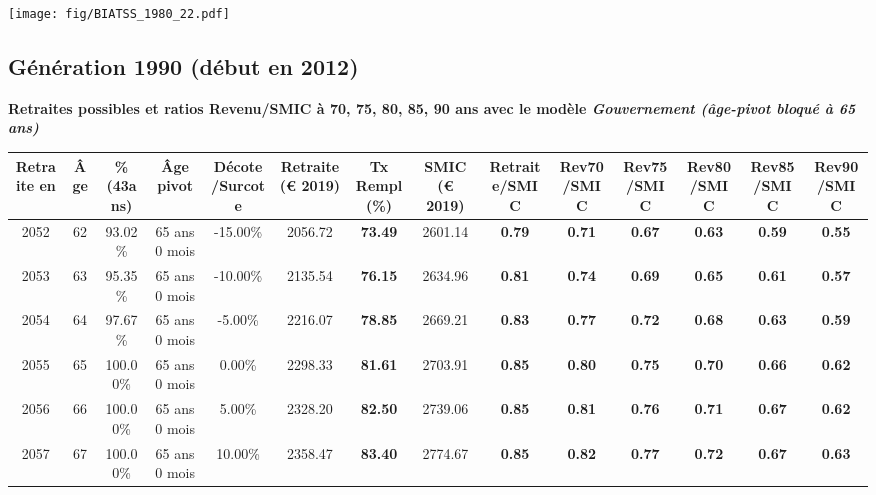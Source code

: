  \vspace{0.1cm} 

 \begin{center}\texttt{[image: fig/BIATSS\_1980\_22.pdf]}\end{center} \label{fig/BIATSS_1980_22.pdf} 

\newpage 
 
\subsection{Génération 1990 (début en 2012)} 

{\bf \noindent Retraites possibles et ratios Revenu/SMIC à 70, 75, 80, 85, 90 ans avec le modèle \emph{Gouvernement (âge-pivot bloqué à 65 ans)}}  
 
\begin{adjustbox}{max width=\textwidth} 
\begin{tabular}[htb]{|c|c||c|c|c||c|c||c||c|c|c|c|c|c|} 
\hline 
 Retraite en &  Âge &  \%(43ans) &  Âge pivot &  Décote/Surcote &  Retraite (\euro{} 2019) &  Tx Rempl(\%) &  SMIC (\euro{} 2019) &  Retraite/SMIC &  Rev70/SMIC &  Rev75/SMIC &  Rev80/SMIC &  Rev85/SMIC &  Rev90/SMIC \\ 
\hline \hline 
 2052 &  62 &  93.02\% &  65 ans 0 mois &  -15.00\% &  2056.72 &  {\bf 73.49} &  2601.14 &  {\bf {\color{red} 0.79}} &  {\bf {\color{red} 0.71}} &  {\bf {\color{red} 0.67}} &  {\bf {\color{red} 0.63}} &  {\bf {\color{red} 0.59}} &  {\bf {\color{red} 0.55}} \\ 
\hline 
 2053 &  63 &  95.35\% &  65 ans 0 mois &  -10.00\% &  2135.54 &  {\bf 76.15} &  2634.96 &  {\bf {\color{red} 0.81}} &  {\bf {\color{red} 0.74}} &  {\bf {\color{red} 0.69}} &  {\bf {\color{red} 0.65}} &  {\bf {\color{red} 0.61}} &  {\bf {\color{red} 0.57}} \\ 
\hline 
 2054 &  64 &  97.67\% &  65 ans 0 mois &  -5.00\% &  2216.07 &  {\bf 78.85} &  2669.21 &  {\bf {\color{red} 0.83}} &  {\bf {\color{red} 0.77}} &  {\bf {\color{red} 0.72}} &  {\bf {\color{red} 0.68}} &  {\bf {\color{red} 0.63}} &  {\bf {\color{red} 0.59}} \\ 
\hline 
 2055 &  65 &  100.00\% &  65 ans 0 mois &  0.00\% &  2298.33 &  {\bf 81.61} &  2703.91 &  {\bf {\color{red} 0.85}} &  {\bf {\color{red} 0.80}} &  {\bf {\color{red} 0.75}} &  {\bf {\color{red} 0.70}} &  {\bf {\color{red} 0.66}} &  {\bf {\color{red} 0.62}} \\ 
\hline 
 2056 &  66 &  100.00\% &  65 ans 0 mois &  5.00\% &  2328.20 &  {\bf 82.50} &  2739.06 &  {\bf {\color{red} 0.85}} &  {\bf {\color{red} 0.81}} &  {\bf {\color{red} 0.76}} &  {\bf {\color{red} 0.71}} &  {\bf {\color{red} 0.67}} &  {\bf {\color{red} 0.62}} \\ 
\hline 
 2057 &  67 &  100.00\% &  65 ans 0 mois &  10.00\% &  2358.47 &  {\bf 83.40} &  2774.67 &  {\bf {\color{red} 0.85}} &  {\bf {\color{red} 0.82}} &  {\bf {\color{red} 0.77}} &  {\bf {\color{red} 0.72}} &  {\bf {\color{red} 0.67}} &  {\bf {\color{red} 0.63}} \\ 
\hline 
\hline 
\end{tabular} 
\end{adjustbox} 
 
